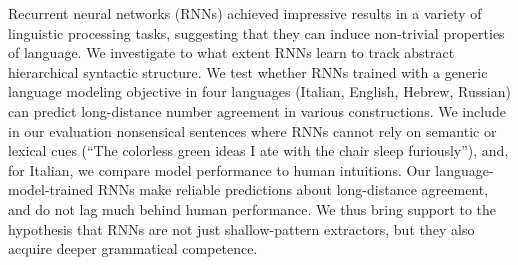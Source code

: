 Recurrent neural networks (RNNs) achieved impressive results in  a variety of linguistic processing tasks, suggesting that they can  induce non-trivial properties of language. We  investigate to what extent RNNs learn to track abstract hierarchical syntactic structure. We test whether RNNs trained with a generic   language modeling objective in four languages (Italian, English, Hebrew, Russian) can predict long-distance number agreement in various constructions. We include in our evaluation nonsensical sentences where RNNs cannot rely on semantic or lexical  cues (``The colorless green ideas I ate with the chair sleep furiously''), and, for Italian, we compare model performance to human intuitions. Our language-model-trained RNNs  make reliable predictions about long-distance  agreement, and do not lag much behind human performance. We thus  bring support to the hypothesis that RNNs are not just shallow-pattern extractors, but they also acquire deeper grammatical competence.
